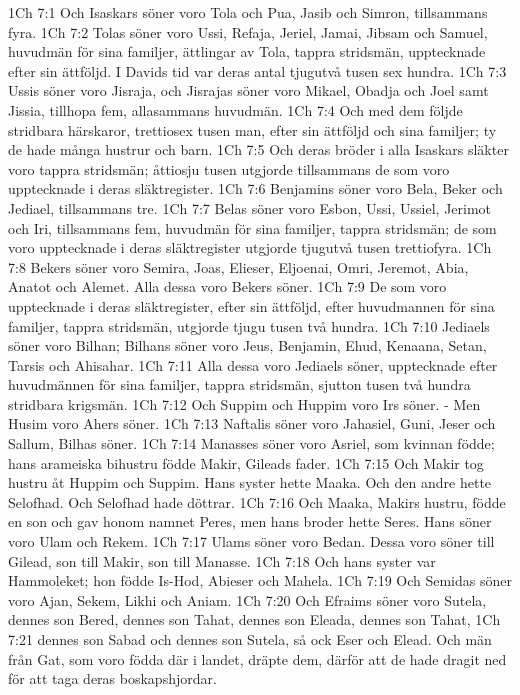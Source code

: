 1Ch 7:1  Och Isaskars söner voro Tola och Pua, Jasib och Simron, tillsammans fyra.
1Ch 7:2  Tolas söner voro Ussi, Refaja, Jeriel, Jamai, Jibsam och Samuel, huvudmän för sina familjer, ättlingar av Tola, tappra stridsmän, upptecknade efter sin ättföljd. I Davids tid var deras antal tjugutvå tusen sex hundra.
1Ch 7:3  Ussis söner voro Jisraja, och Jisrajas söner voro Mikael, Obadja och Joel samt Jissia, tillhopa fem, allasammans huvudmän.
1Ch 7:4  Och med dem följde stridbara härskaror, trettiosex tusen man, efter sin ättföljd och sina familjer; ty de hade många hustrur och barn.
1Ch 7:5  Och deras bröder i alla Isaskars släkter voro tappra stridsmän; åttiosju tusen utgjorde tillsammans de som voro upptecknade i deras släktregister.
1Ch 7:6  Benjamins söner voro Bela, Beker och Jediael, tillsammans tre.
1Ch 7:7  Belas söner voro Esbon, Ussi, Ussiel, Jerimot och Iri, tillsammans fem, huvudmän för sina familjer, tappra stridsmän; de som voro upptecknade i deras släktregister utgjorde tjugutvå tusen trettiofyra.
1Ch 7:8  Bekers söner voro Semira, Joas, Elieser, Eljoenai, Omri, Jeremot, Abia, Anatot och Alemet. Alla dessa voro Bekers söner.
1Ch 7:9  De som voro upptecknade i deras släktregister, efter sin ättföljd, efter huvudmannen för sina familjer, tappra stridsmän, utgjorde tjugu tusen två hundra.
1Ch 7:10  Jediaels söner voro Bilhan; Bilhans söner voro Jeus, Benjamin, Ehud, Kenaana, Setan, Tarsis och Ahisahar.
1Ch 7:11  Alla dessa voro Jediaels söner, upptecknade efter huvudmännen för sina familjer, tappra stridsmän, sjutton tusen två hundra stridbara krigsmän.
1Ch 7:12  Och Suppim och Huppim voro Irs söner. - Men Husim voro Ahers söner.
1Ch 7:13  Naftalis söner voro Jahasiel, Guni, Jeser och Sallum, Bilhas söner.
1Ch 7:14  Manasses söner voro Asriel, som kvinnan födde; hans arameiska bihustru födde Makir, Gileads fader.
1Ch 7:15  Och Makir tog hustru åt Huppim och Suppim. Hans syster hette Maaka. Och den andre hette Selofhad. Och Selofhad hade döttrar.
1Ch 7:16  Och Maaka, Makirs hustru, födde en son och gav honom namnet Peres, men hans broder hette Seres. Hans söner voro Ulam och Rekem.
1Ch 7:17  Ulams söner voro Bedan. Dessa voro söner till Gilead, son till Makir, son till Manasse.
1Ch 7:18  Och hans syster var Hammoleket; hon födde Is-Hod, Abieser och Mahela.
1Ch 7:19  Och Semidas söner voro Ajan, Sekem, Likhi och Aniam.
1Ch 7:20  Och Efraims söner voro Sutela, dennes son Bered, dennes son Tahat, dennes son Eleada, dennes son Tahat,
1Ch 7:21  dennes son Sabad och dennes son Sutela, så ock Eser och Elead. Och män från Gat, som voro födda där i landet, dräpte dem, därför att de hade dragit ned för att taga deras boskapshjordar.
